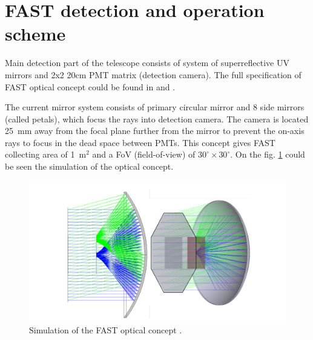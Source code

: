  
\section{FAST detection and operation scheme}
Main detection part of the telescope consists of system of superreflective UV mirrors and 2x2 20cm PMT matrix (detection camera). The full specification of FAST optical concept could be found in \cite{Mandat_2017} and \cite{MALACARI2020102430}.

\par

The current mirror system consists of primary circular mirror and 8 side mirrors (called petals), which focus the rays into detection camera. The camera is located 25~mm away from the focal plane further from the mirror to prevent the on-axis rays to focus in the dead space between PMTs. This concept gives FAST collecting area of 1~m$^2$ and a FoV (field-of-view) of $30^{\circ} \times 30^{\circ}$. On the fig. \ref{FASTConc} could be seen the simulation of the optical concept.



\begin{figure}[H]
 \centering
 \includegraphics[scale = 0.2]{./pictures/FASTfocusing}
 \caption{Simulation of the FAST optical concept \cite{Mandat_2017}.}
 \label{FASTConc}
 
\end{figure}


